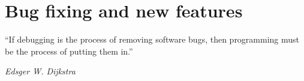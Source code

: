 \chapter{Bug fixing and new features}\label{chap:lipsum}

\epigraph{``If debugging is the process of removing software bugs, then programming must be the process of putting them in.''}{\textit{Edsger W. Dijkstra}}

